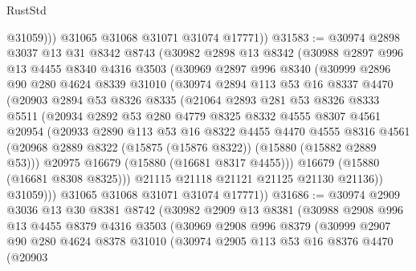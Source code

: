 \begin{lexlean}{RustStd}
\begin{coremodule}
              @31059)))
        @31065
        @31068
        @31071
        @31074
        @17771))
@31583 := @30974
    @2898
    @3037
    @13
    @31
    @8342
    @8743
    (@30982
      @2898
      @13
      @8342
      (@30988
        @2897
        @996
        @13
        @4455
        @8340
        @4316
        @3503
        (@30969
          @2897
          @996
          @8340
          (@30999
            @2896
            @90
            @280
            @4624
            @8339
            @31010
            (@30974
              @2894
              @113
              @53
              @16
              @8337
              @4470
              (@20903
                @2894
                @53
                @8326
                @8335
                (@21064
                  @2893
                  @281
                  @53
                  @8326
                  @8333
                  @5511
                  (@20934
                    @2892
                    @53
                    @280
                    @4779
                    @8325
                    @8332
                    @4555
                    @8307
                    @4561
                    @20954
                    (@20933
                      @2890
                      @113
                      @53
                      @16
                      @8322
                      @4455
                      @4470
                      @4555
                      @8316
                      @4561
                      (@20968 @2889 @8322 (@15875 (@15876 @8322)) (@15880 (@15882 @2889 @53)))
                      @20975
                      @16679
                      (@15880 (@16681 @8317 @4455)))
                    @16679
                    (@15880 (@16681 @8308 @8325)))
                  @21115
                  @21118
                  @21121
                  @21125
                  @21130
                  @21136))
              @31059)))
        @31065
        @31068
        @31071
        @31074
        @17771))
@31686 := @30974
    @2909
    @3036
    @13
    @30
    @8381
    @8742
    (@30982
      @2909
      @13
      @8381
      (@30988
        @2908
        @996
        @13
        @4455
        @8379
        @4316
        @3503
        (@30969
          @2908
          @996
          @8379
          (@30999
            @2907
            @90
            @280
            @4624
            @8378
            @31010
            (@30974
              @2905
              @113
              @53
              @16
              @8376
              @4470
              (@20903

\end{coremodule}
\end{lexlean}
